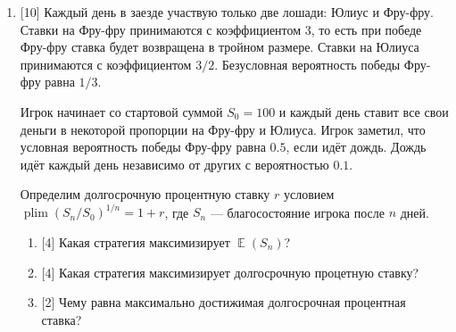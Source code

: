 \documentclass[12pt]{article}
\DeclareMathOperator{\E}{\mathbb{E}}
\DeclareMathOperator{\plim}{plim}
\begin{document}
\begin{enumerate}

\item {[10]} Каждый день в заезде участвую только две лошади: Юлиус и Фру-фру. 
Ставки на Фру-фру принимаются с коэффициентом $3$, то есть при победе Фру-фру ставка будет возвращена в тройном размере. 
Ставки на Юлиуса принимаются с коэффициентом $3/2$.
Безусловная вероятность победы Фру-фру равна $1/3$. 

Игрок начинает со стартовой суммой $S_0 = 100$ и каждый день ставит все свои деньги в некоторой пропорции на Фру-фру и Юлиуса. 
Игрок заметил, что условная вероятность победы Фру-фру равна $0.5$, если идёт дождь. 
Дождь идёт каждый день независимо от других с вероятностью $0.1$.

Определим долгосрочную процентную ставку $r$ условием $\plim (S_n / S_0)^{1/n} = 1 + r$, где $S_n$ — благосостояние игрока после $n$ дней.
\begin{enumerate}
    \item {[4]} Какая стратегия максимизирует $\E(S_n)$?
    \item {[4]} Какая стратегия максимизирует долгосрочную процетную ставку?
    \item {[2]} Чему равна максимально достижимая долгосрочная процентная ставка?
\end{enumerate}

\end{enumerate}
    
\end{document}
